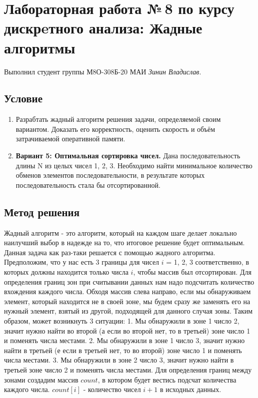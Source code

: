 \documentclass[12pt]{article}
\begin{document}
    \section*{Лабораторная работа №\,8 по курсу дискрeтного анализа: 
    Жадные алгоритмы}

    Выполнил студент группы М8О-308Б-20 МАИ \textit{Зинин Владислав}.

    \subsection*{Условие}
 
    \begin{enumerate}
    \item Разрабтать жадный алгоритм решения задачи, определяемой своим
    вариантом. Доказать его корректность, оценить скорость и объём
    затрачиваемой оперативной памяти.
    \item \textbf{Вариант 5: Оптимальная сортировка чисел.} Дана последовательность длины N из целых чисел 1, 2, 3. 
    Необходимо найти минимальное количество обменов элементов последовательности, 
    в результате которых последовательность стала бы отсортированной.
    \end{enumerate}

    \subsection*{Метод решения}

    Жадный алгоритм - это алгоритм, который на каждом шаге делает локально наилучший выбор в надежде на то, что
    итоговое решение будет оптимальным. Данная задача как раз-таки решается с помощью жадного алгоритма.
    Предположим, что у нас есть 3 границы для чисел $i$ = 1, 2, 3 соответственно, в которых должны находится только числа $i$, чтобы
    массив был отсортирован. Для определения границ зон при считывании данных нам надо подсчитать количество вхождения каждого числа.
    Обходя массив слева направо, если мы обнаруживаем элемент, который находится не в своей зоне, мы будем сразу же заменять его на нужный элемент, взятый
    из другой, подходящей для данного случая зоны.
    Таким образом, может возникнуть 3 ситуации:
        1. Мы обнаружили в зоне 1 число 2, значит нужно найти во второй (а если во второй нет, то в третьей) зоне
        число 1 и поменять числа местами.
        2. Мы обнаружили в зоне 1 число 3, значит нужно найти в третьей (е если в третьей нет, то во второй) зоне число 1 и поменять числа местами.
        3. Мы обнаружили в зоне 2 число 3, значит нужно найти в третьей зоне число 2 и поменять числа местами.
    Для определения границ между зонами создадим массив $count$, в котором будет вестись подсчат количества каждого числа. $count[i]$ - количество чисел $i + 1$ в исходных данных.
\end{document}
